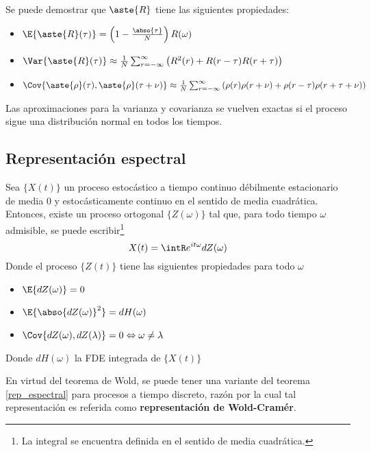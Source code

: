 Se puede demostrar que $\aste{R}$ tiene las siguientes propiedades:
\begin{itemize}
\item $\E{\aste{R}(\tau)} = \left(1 - \frac{\abso{\tau}}{N} \right) R(\omega)$
\item $\Var{\aste{R}(\tau)} \approx \frac{1}{N} 
\sum_{r=-\infty}^{\infty} \left( R^{2}(r) + R(r-\tau)R(r+\tau) \right)$
\item $\Cov{\aste{\rho}(\tau),\aste{\rho}(\tau+\nu)} \approx \frac{1}{N} 
\sum_{r=-\infty}^{\infty} \left( \rho(r)\rho(r+\nu) + \rho(r-\tau)\rho(r+\tau+\nu) \right)$
\end{itemize}
Las aproximaciones para la varianza y covarianza se vuelven exactas si el proceso sigue una 
distribuci\'on normal en todos los tiempos.


\subsection{Representación espectral}

\begin{teorema}
Sea $\{X(t)\}$ un proceso estoc\'astico a tiempo continuo d\'ebilmente estacionario de media 0 y 
estoc\'asticamente continuo en el sentido de media cuadr\'atica. Entonces, existe un proceso 
ortogonal $\{Z(\omega)\}$ tal que, para todo tiempo $\omega$ admisible, se puede 
escribir\footnote{La integral se encuentra definida en el sentido de media cuadr\'atica.}
\begin{equation*}
X(t) = \intR e^{i t \omega} dZ(\omega)
\end{equation*}
Donde el proceso $\{Z(t)\}$ tiene las siguientes propiedades para todo $\omega$
\begin{itemize}
\item $\E{dZ(\omega)} = 0$
\item $\E{\abso{dZ(\omega)}^{2}} = dH(\omega)$
\item $\Cov{dZ(\omega),dZ(\lambda)} = 0 \Leftrightarrow \omega \neq \lambda$
\end{itemize}
Donde $dH(\omega)$ la FDE integrada de $\{X(t)\}$
\end{teorema}

En virtud del teorema de Wold, se puede tener una variante del teorema \ref{rep_espectral}
para procesos a tiempo discreto, raz\'on por la cual  
tal representaci\'on es referida como \textbf{representaci\'on de Wold-Cram\'er}.

